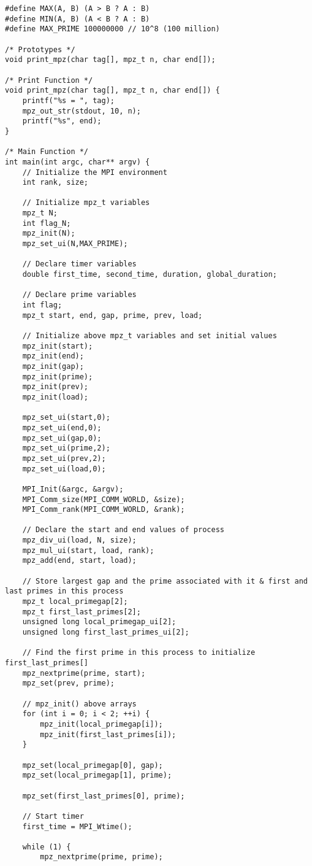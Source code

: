 \documentclass[12pt]{article}
\begin{document}
{\begin{lstlisting}
#define MAX(A, B) (A > B ? A : B)
#define MIN(A, B) (A < B ? A : B)
#define MAX_PRIME 100000000 // 10^8 (100 million)

/* Prototypes */
void print_mpz(char tag[], mpz_t n, char end[]);

/* Print Function */
void print_mpz(char tag[], mpz_t n, char end[]) {
	printf("%s = ", tag);
	mpz_out_str(stdout, 10, n);
	printf("%s", end);
}

/* Main Function */
int main(int argc, char** argv) {
	// Initialize the MPI environment
	int rank, size;

	// Initialize mpz_t variables
	mpz_t N;
	int flag_N;
	mpz_init(N);
	mpz_set_ui(N,MAX_PRIME);

	// Declare timer variables
	double first_time, second_time, duration, global_duration;

	// Declare prime variables
	int flag;
	mpz_t start, end, gap, prime, prev, load;

	// Initialize above mpz_t variables and set initial values
	mpz_init(start);
	mpz_init(end);
	mpz_init(gap);
	mpz_init(prime);
	mpz_init(prev);
	mpz_init(load);

	mpz_set_ui(start,0);
	mpz_set_ui(end,0);
	mpz_set_ui(gap,0);
	mpz_set_ui(prime,2);
	mpz_set_ui(prev,2);
	mpz_set_ui(load,0);

	MPI_Init(&argc, &argv);
	MPI_Comm_size(MPI_COMM_WORLD, &size);
	MPI_Comm_rank(MPI_COMM_WORLD, &rank);

	// Declare the start and end values of process
	mpz_div_ui(load, N, size);
	mpz_mul_ui(start, load, rank);
	mpz_add(end, start, load);

	// Store largest gap and the prime associated with it & first and last primes in this process
	mpz_t local_primegap[2]; 
	mpz_t first_last_primes[2]; 
	unsigned long local_primegap_ui[2];
	unsigned long first_last_primes_ui[2];

	// Find the first prime in this process to initialize first_last_primes[]
	mpz_nextprime(prime, start);
	mpz_set(prev, prime);

	// mpz_init() above arrays
	for (int i = 0; i < 2; ++i) {
		mpz_init(local_primegap[i]);
		mpz_init(first_last_primes[i]);
	}

	mpz_set(local_primegap[0], gap);
	mpz_set(local_primegap[1], prime);

	mpz_set(first_last_primes[0], prime);

	// Start timer
	first_time = MPI_Wtime();

	while (1) {
		mpz_nextprime(prime, prime);


\end{lstlisting}}
\end{document}
